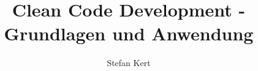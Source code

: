 \documentclass[bachelor,german]{hgbthesis}
\begin{document}
\title{Clean Code Development - Grundlagen und Anwendung}
\author{Stefan Kert}
\frontmatter
\maketitle
\tableofcontents

		
			

\mainmatter 









\appendix

\MakeBibliography
\end{document}
